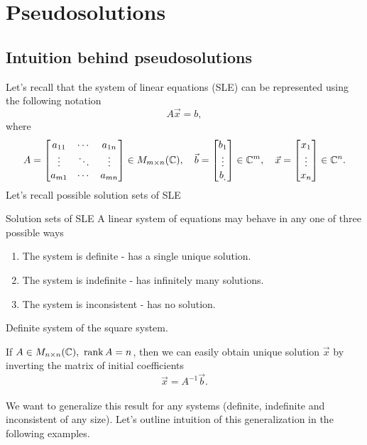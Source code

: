 \setcounter{section}{1}

\section{Pseudosolutions}
\subsection*{Intuition behind pseudosolutions}
    \par 
    Let's recall that the system of linear equations (SLE) can be represented using the following notation
    \[
        A\vec{x} = b,
    \]
    where
    \[
        A = 
            \begin{bmatrix}
                a_{11} & \cdots & a_{1n}\\
                \vdots & \ddots & \vdots\\
                a_{m1} & \cdots & a_{mn} 
            \end{bmatrix}
        \in M_{m\times n}(\mathbb{C}), \quad 
        \vec{b} = \begin{bmatrix}  b_1 \\\vdots \\b_,\end{bmatrix} \in \mathbb{C}^m, \quad
        \vec{x} = \begin{bmatrix}  x_1 \\\vdots \\x_n\end{bmatrix} \in \mathbb{C}^n.
    \]
    Let's recall possible solution sets of SLE
    \begin{theorema}{Solution sets of SLE}
        A linear system of equations may behave in any one of three possible ways
        \begin{enumerate} 
            \item The system is definite - has a single unique solution.
            \item The system is indefinite - has infinitely many solutions.
            \item The system is inconsistent - has no solution.
        \end{enumerate}
    \end{theorema}
     \Ex Definite system of the square system.
    
        If $A \in M_{n\times n}(\mathbb{C}), \ \operatorname{rank} A = n$, then we can easily obtain unique solution $\vec{x}$ by inverting the matrix of initial coefficients
            \[
                \vec{x}  = A^{-1}\vec{b}.
            \]\\
    We want to generalize this result for any systems (definite, indefinite and inconsistent of any size). Let's outline intuition of this generalization in the following examples.
